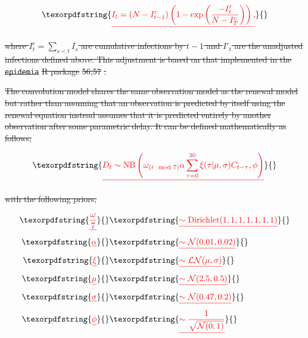\documentclass[10pt,letterpaper]{article}
\providecommand{\DIFdeltex}[1]{{\protect\color{red}\sout{#1}}}                      %
\providecommand{\DIFdel}[1]{\texorpdfstring{\DIFdeltex{#1}}{}} %
\begin{document}
\begin{displaymath}
    \DIFdel{I_t = (N - I^c_{t-1}) \left(1 - \exp \left(\frac{-I'_t}{N - I^c_{T}}\right)\right),
}\end{displaymath}%

\DIFdel{where \(I^c_t = \sum_{s< t} I_s\) are cumulative infections by \(t-1\)
and \(I'_t\) are
the unadjusted infections defined above. This
adjustment is based on that implemented in the }\texttt{\DIFdel{epidemia}} %
\DIFdel{R
package }%
\DIFdel{56,57}%
\DIFdel{.
}%


\DIFdel{The convolution model shares the same observation model as the
renewal
model but rather than assuming that an observation is predicted by
itself using the renewal equation instead assumes that it is predicted
entirely by another observation after some parametric delay. It can be
defined mathematically as follows, }%

\begin{displaymath} 
    \DIFdel{D_{t} \sim \mathrm{NB}\left(\omega_{(t \mod 7)} \alpha \sum_{\tau = 0}^{30} \xi(\tau | \mu, \sigma) C_{t-\tau},  \phi \right)
}\end{displaymath}%

\DIFdel{with the following priors,
}%

\begin{align*}
    \DIFdel{\frac{\omega}{7} }&\DIFdel{\sim \mathrm{Dirichlet}(1, 1, 1, 1, 1, 1, 1) }\\
    \DIFdel{\alpha }&\DIFdel{\sim \mathcal{N}(0.01, 0.02) }\\
    \DIFdel{\xi }&\DIFdel{\sim \mathcal{LN}(\mu, \sigma) }\\
    \DIFdel{\mu }&\DIFdel{\sim \mathcal{N}(2.5, 0.5) }\\
\DIFdel{\sigma }&\DIFdel{\sim \mathcal{N}(0.47, 0.2) }\\
\DIFdel{\phi }&\DIFdel{\sim \frac{1}{\sqrt{\mathcal{N}(0, 1)}}
}\end{align*}%
\end{document}
